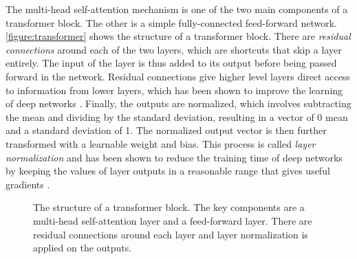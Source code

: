 The multi-head self-attention mechanism is one of the 
two main components of a transformer block. The other is 
a simple fully-connected feed-forward network.
\autoref{figure:transformer} shows the structure of a 
transformer block. There are
\textit{residual connections} around each of the two
layers, which are shortcuts that skip a layer entirely.
The input of the layer is thus added to its output 
before being passed forward in the network.
Residual connections give
higher level layers direct access to 
information from lower layers, which has been shown 
to improve the learning of deep networks
\parencite{residual}. 
Finally, the outputs are normalized, which involves
subtracting the mean and dividing by the standard
deviation, resulting in a vector of 0 mean and a 
standard deviation of 1. The normalized output
vector is then 
further transformed with a learnable weight and bias. 
This process is called \textit{layer normalization} and
has been shown to reduce the training time of deep 
networks by keeping the values of layer outputs in 
a reasonable range that gives useful gradients
\parencite{layernorm}.



\begin{figure}
    \centering
    
    \caption[The structure of a transformer block]
    {The structure of a transformer block. The key 
    components are a multi-head self-attention layer 
    and a feed-forward layer. There are residual 
    connections around each layer and layer normalization
    is applied on the outputs.}
    \label{figure:transformer}
\end{figure}




